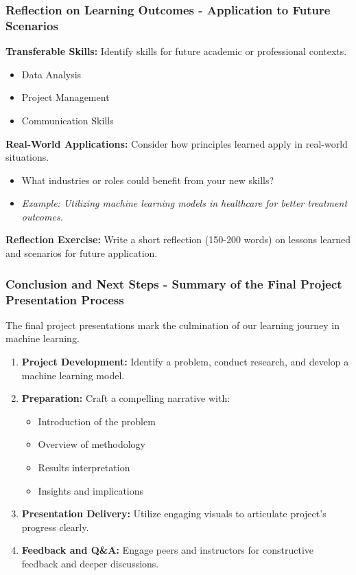 \documentclass[aspectratio=169]{beamer}
\begin{document}
\begin{frame}[fragile]
  \frametitle{Reflection on Learning Outcomes - Application to Future Scenarios}
  \textbf{Transferable Skills:} 
  Identify skills for future academic or professional contexts.
  \begin{itemize}
    \item Data Analysis
    \item Project Management
    \item Communication Skills
  \end{itemize}
  
  \textbf{Real-World Applications:}
  Consider how principles learned apply in real-world situations. 
  \begin{itemize}
    \item What industries or roles could benefit from your new skills?
    \item \textit{Example: Utilizing machine learning models in healthcare for better treatment outcomes.}
  \end{itemize}
  
  \textbf{Reflection Exercise:} 
  Write a short reflection (150-200 words) on lessons learned and scenarios for future application.
\end{frame}

\begin{frame}[fragile]
    \frametitle{Conclusion and Next Steps - Summary of the Final Project Presentation Process}
    The final project presentations mark the culmination of our learning journey in machine learning. 
    \begin{enumerate}
        \item \textbf{Project Development:} Identify a problem, conduct research, and develop a machine learning model.
        \item \textbf{Preparation:} Craft a compelling narrative with:
            \begin{itemize}
                \item Introduction of the problem
                \item Overview of methodology
                \item Results interpretation
                \item Insights and implications
            \end{itemize}
        \item \textbf{Presentation Delivery:} Utilize engaging visuals to articulate project's progress clearly.
        \item \textbf{Feedback and Q\&A:} Engage peers and instructors for constructive feedback and deeper discussions.
    \end{enumerate}
\end{frame}
\end{document}
